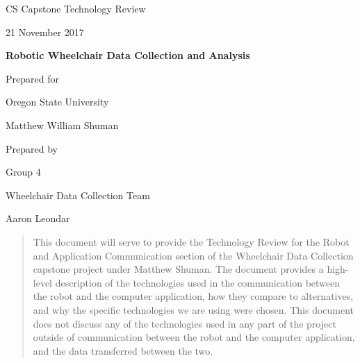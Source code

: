 \documentclass[onecolumn, draftclsnofoot,10pt, compsoc]{IEEEtran}
\def \CapstoneTeamName{		Wheelchair Data Collection Team}
\def \CapstoneTeamNumber{		4}
\def \GroupMemberOne{			Marie Bomber}
\def \GroupMemberTwo{			Aaron Leondar}
\def \GroupMemberThree{			Hadi Rahal-Arabi}
\def \CapstoneProjectName{			Robotic Wheelchair Data Collection and Analysis}
\def \CapstoneSponsorCompany{	Oregon State University}
\def \CapstoneSponsorPerson{	Matthew William Shuman	}
\def \DocType{	%
				Technology Review
				}
\newcommand{\NameSigPair}[1]{\par
\makebox[2.75in][r]{#1} \hfil 	\makebox[3.25in]{\makebox[2.25in]{\hrulefill} \hfill		\makebox[.75in]{\hrulefill}}
\par\vspace{-12pt} \textit{\tiny\noindent
\makebox[2.75in]{} \hfil		\makebox[3.25in]{\makebox[2.25in][r]{Signature} \hfill	\makebox[.75in][r]{Date}}}}
\renewcommand{\NameSigPair}[1]{#1}
\begin{document}
\begin{titlepage}
    \begin{singlespace}
        \hfill 
        \par\vspace{.2in}
        \centering
        \scshape{
            \huge CS Capstone \DocType \par
            {\large 21 November 2017}\par
            \vspace{.5in}
            \textbf{\Huge\CapstoneProjectName}\par
            \vfill
            {\large Prepared for}\par
            \Huge \CapstoneSponsorCompany\par
            \vspace{5pt}
            {\Large\NameSigPair{\CapstoneSponsorPerson}\par}
            {\large Prepared by }\par
            Group\CapstoneTeamNumber\par
            \CapstoneTeamName\par 
            \vspace{5pt}
            {\Large
                \NameSigPair{\GroupMemberTwo}\par
            }
            \vspace{20pt}
                    \begin{abstract}
This document will serve to provide the Technology Review for the Robot and Application Communication section of the Wheelchair Data Collection capstone project under Matthew Shuman. The document provides a high-level description of the technologies used in the communication between the robot and the computer application, how they compare to alternatives, and why the specific technologies we are using were chosen. This document does not discuss any of the technologies used in any part of the project outside of communication between the robot and the computer application, and the data transferred between the two. 
            \end{abstract} 
        }   
    \end{singlespace}
\end{titlepage}
\newpage
{}
\tableofcontents
\clearpage
\end{document}
